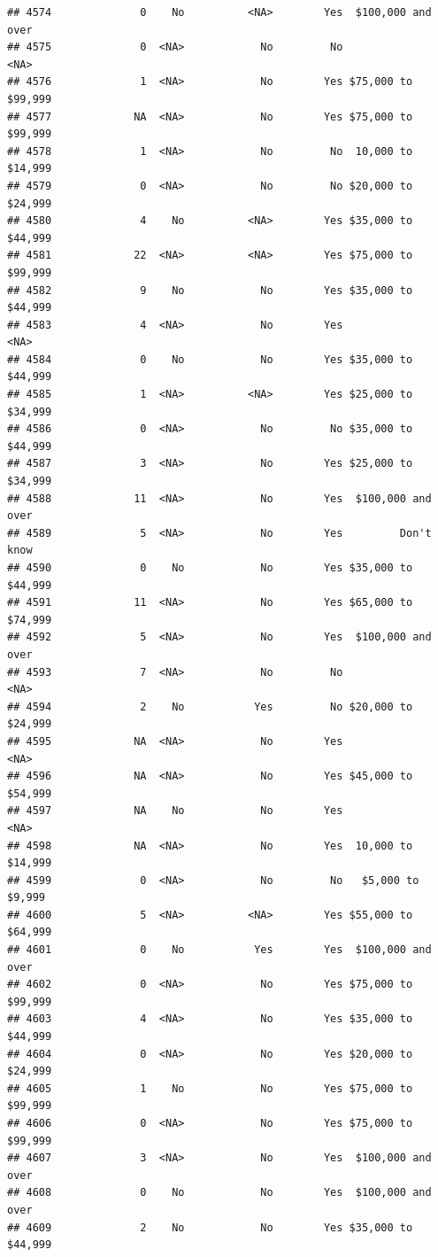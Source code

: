 \documentclass[man]{apa6}
\begin{document}
\begin{verbatim}
## 4574              0    No          <NA>        Yes  $100,000 and over
## 4575              0  <NA>            No         No               <NA>
## 4576              1  <NA>            No        Yes $75,000 to $99,999
## 4577             NA  <NA>            No        Yes $75,000 to $99,999
## 4578              1  <NA>            No         No  10,000 to $14,999
## 4579              0  <NA>            No         No $20,000 to $24,999
## 4580              4    No          <NA>        Yes $35,000 to $44,999
## 4581             22  <NA>          <NA>        Yes $75,000 to $99,999
## 4582              9    No            No        Yes $35,000 to $44,999
## 4583              4  <NA>            No        Yes               <NA>
## 4584              0    No            No        Yes $35,000 to $44,999
## 4585              1  <NA>          <NA>        Yes $25,000 to $34,999
## 4586              0  <NA>            No         No $35,000 to $44,999
## 4587              3  <NA>            No        Yes $25,000 to $34,999
## 4588             11  <NA>            No        Yes  $100,000 and over
## 4589              5  <NA>            No        Yes         Don't know
## 4590              0    No            No        Yes $35,000 to $44,999
## 4591             11  <NA>            No        Yes $65,000 to $74,999
## 4592              5  <NA>            No        Yes  $100,000 and over
## 4593              7  <NA>            No         No               <NA>
## 4594              2    No           Yes         No $20,000 to $24,999
## 4595             NA  <NA>            No        Yes               <NA>
## 4596             NA  <NA>            No        Yes $45,000 to $54,999
## 4597             NA    No            No        Yes               <NA>
## 4598             NA  <NA>            No        Yes  10,000 to $14,999
## 4599              0  <NA>            No         No   $5,000 to $9,999
## 4600              5  <NA>          <NA>        Yes $55,000 to $64,999
## 4601              0    No           Yes        Yes  $100,000 and over
## 4602              0  <NA>            No        Yes $75,000 to $99,999
## 4603              4  <NA>            No        Yes $35,000 to $44,999
## 4604              0  <NA>            No        Yes $20,000 to $24,999
## 4605              1    No            No        Yes $75,000 to $99,999
## 4606              0  <NA>            No        Yes $75,000 to $99,999
## 4607              3  <NA>            No        Yes  $100,000 and over
## 4608              0    No            No        Yes  $100,000 and over
## 4609              2    No            No        Yes $35,000 to $44,999

\end{verbatim}
\end{document}
